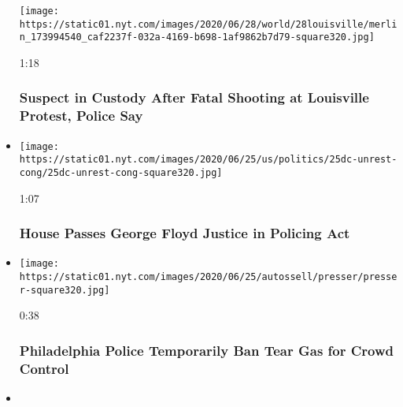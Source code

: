 \begin{itemize}
  \texttt{[image: https://static01.nyt.com/images/2020/06/28/world/28louisville/merlin\_173994540\_caf2237f-032a-4169-b698-1af9862b7d79-square320.jpg]}

  1:18

  \hypertarget{suspect-in-custody-after-fatal-shooting-at-louisville-protest-police-say}{%
  \subsubsection{Suspect in Custody After Fatal Shooting at Louisville
  Protest, Police
  Say}\label{suspect-in-custody-after-fatal-shooting-at-louisville-protest-police-say}}
\item
  \href{https://www.nytimes.com/video/us/politics/100000007211025/house-passes-police-reform-bill.html?action=click\&module=video-series-bar\&region=header\&pgtype=Article\&playlistId=video/minneapolis-george-floyd-death-video}{}

  \texttt{[image: https://static01.nyt.com/images/2020/06/25/us/politics/25dc-unrest-cong/25dc-unrest-cong-square320.jpg]}

  1:07

  \hypertarget{house-passes-george-floyd-justice-in-policing-act}{%
  \subsubsection{House Passes George Floyd Justice in Policing
  Act}\label{house-passes-george-floyd-justice-in-policing-act}}
\item
  \href{https://www.nytimes.com/video/us/100000007210395/philadelphia-police-ban-tear-gas.html?action=click\&module=video-series-bar\&region=header\&pgtype=Article\&playlistId=video/minneapolis-george-floyd-death-video}{}

  \texttt{[image: https://static01.nyt.com/images/2020/06/25/autossell/presser/presser-square320.jpg]}

  0:38

  \hypertarget{philadelphia-police-temporarily-ban-tear-gas-for-crowd-control}{%
  \subsubsection{Philadelphia Police Temporarily Ban Tear Gas for Crowd
  Control}\label{philadelphia-police-temporarily-ban-tear-gas-for-crowd-control}}
\item
  \href{https://www.nytimes.com/video/us/100000007174941/philadelphia-tear-gas-george-floyd-protests.html?action=click\&module=video-series-bar\&region=header\&pgtype=Article\&playlistId=video/minneapolis-george-floyd-death-video}{}


\end{itemize}
